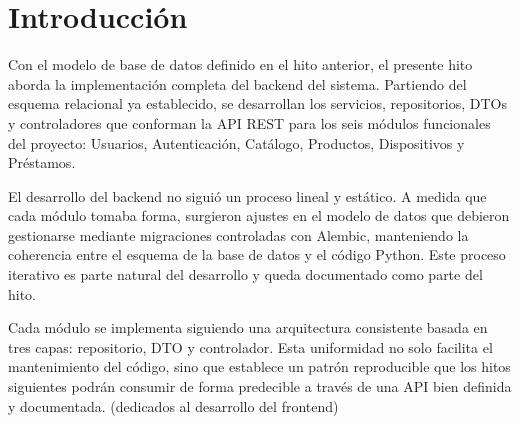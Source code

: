 \section{Introducción}

Con el modelo de base de datos definido en el hito anterior, el presente hito aborda 
la implementación completa del backend del sistema. Partiendo del esquema relacional 
ya establecido, se desarrollan los servicios, repositorios, DTOs y controladores que 
conforman la API REST para los seis módulos funcionales del proyecto: Usuarios, 
Autenticación, Catálogo, Productos, Dispositivos y Préstamos.

El desarrollo del backend no siguió un proceso lineal y estático. A medida que cada 
módulo tomaba forma, surgieron ajustes en el modelo de datos que debieron gestionarse 
mediante migraciones controladas con Alembic, manteniendo la coherencia entre el 
esquema de la base de datos y el código Python. Este proceso iterativo es parte natural 
del desarrollo y queda documentado como parte del hito.

Cada módulo se implementa siguiendo una arquitectura consistente basada en tres capas: 
repositorio, DTO y controlador. Esta uniformidad no solo facilita el mantenimiento del 
código, sino que establece un patrón reproducible que los hitos siguientes podrán consumir de forma predecible a través de una API 
bien definida y documentada.
(dedicados 
al desarrollo del frontend)